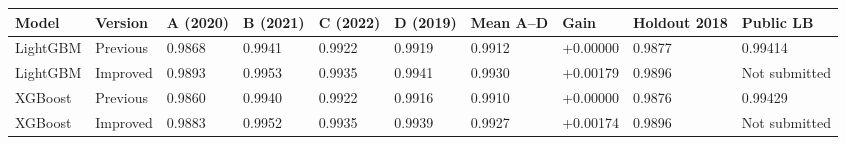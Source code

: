 \begin{tabular}{llllllllll}
\toprule
Model & Version & A (2020) & B (2021) & C (2022) & D (2019) & Mean A--D & Gain & Holdout 2018 & Public LB \\
\midrule
LightGBM & Previous & 0.9868 & 0.9941 & 0.9922 & 0.9919 & 0.9912 & +0.00000 & 0.9877 & 0.99414 \\
LightGBM & Improved & 0.9893 & 0.9953 & 0.9935 & 0.9941 & 0.9930 & +0.00179 & 0.9896 & Not submitted \\
XGBoost & Previous & 0.9860 & 0.9940 & 0.9922 & 0.9916 & 0.9910 & +0.00000 & 0.9876 & 0.99429 \\
XGBoost & Improved & 0.9883 & 0.9952 & 0.9935 & 0.9939 & 0.9927 & +0.00174 & 0.9896 & Not submitted \\
\bottomrule
\end{tabular}
